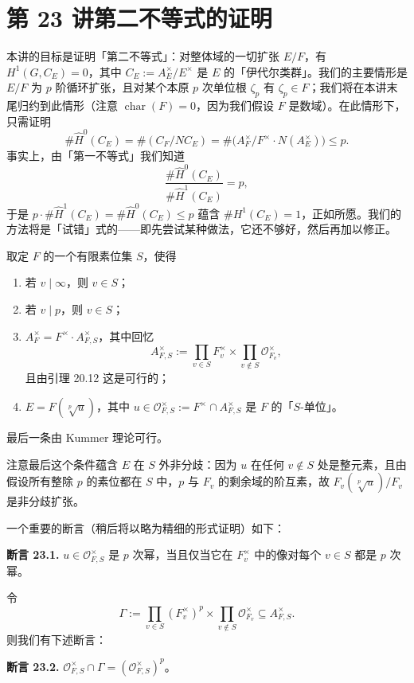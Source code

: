 \section*{第 23 讲\quad 第二不等式的证明}

本讲的目标是证明「第二不等式」：对整体域的一切扩张 $E/F$，有 $H^1(G,C_E)=0$，其中 $C_E:=A_E^\times/E^\times$ 是 $E$ 的「伊代尔类群」。我们的主要情形是 $E/F$ 为 $p$ 阶循环扩张，且对某个本原 $p$ 次单位根 $\zeta_p$ 有 $\zeta_p\in F$；我们将在本讲末尾归约到此情形（注意 $\operatorname{char}(F)=0$，因为我们假设 $F$ 是数域）。在此情形下，只需证明
\[
\#\widehat H^0(C_E)=\#(C_F/NC_E)=\#\bigl(A_F^\times/F^\times\cdot N(A_E^\times)\bigr)\le p.
\]
事实上，由「第一不等式」我们知道
\[
\frac{\#\widehat H^0(C_E)}{\#\widehat H^1(C_E)}=p,
\]
于是 $p\cdot\#\widehat H^1(C_E)=\#\widehat H^0(C_E)\le p$ 蕴含 $\#H^1(C_E)=1$，正如所愿。我们的方法将是「试错」式的——即先尝试某种做法，它还不够好，然后再加以修正。

取定 $F$ 的一个有限素位集 $S$，使得
\begin{enumerate}[label=(\arabic*),leftmargin=2.4em]
\item 若 $v\mid\infty$，则 $v\in S$；
\item 若 $v\mid p$，则 $v\in S$；
\item $A_F^\times=F^\times\cdot A_{F,S}^\times$，其中回忆
\[
A_{F,S}^\times:=\prod_{v\in S}F_v^\times\times\prod_{v\notin S}\mathcal{O}_{F_v}^\times,
\]
且由引理 20.12 这是可行的；
\item $E=F(\sqrt[p]{u})$，其中 $u\in\mathcal{O}_{F,S}^\times:=F^\times\cap A_{F,S}^\times$ 是 $F$ 的「$S$-单位」。
\end{enumerate}
最后一条由 Kummer 理论可行。

注意最后这个条件蕴含 $E$ 在 $S$ 外非分歧：因为 $u$ 在任何 $v\notin S$ 处是整元素，且由假设所有整除 $p$ 的素位都在 $S$ 中，$p$ 与 $F_v$ 的剩余域的阶互素，故 $F_v(\sqrt[p]{u})/F_v$ 是非分歧扩张。

一个重要的断言（稍后将以略为精细的形式证明）如下：

\textbf{断言 23.1.} $u\in\mathcal{O}_{F,S}^\times$ 是 $p$ 次幂，当且仅当它在 $F_v^\times$ 中的像对每个 $v\in S$ 都是 $p$ 次幂。

令
\[
\Gamma:=\prod_{v\in S}(F_v^\times)^p\times\prod_{v\notin S}\mathcal{O}_{F_v}^\times\subseteq A_{F,S}^\times.
\]
则我们有下述断言：

\textbf{断言 23.2.} $\mathcal{O}_{F,S}^\times\cap\Gamma=(\mathcal{O}_{F,S}^\times)^p$。

